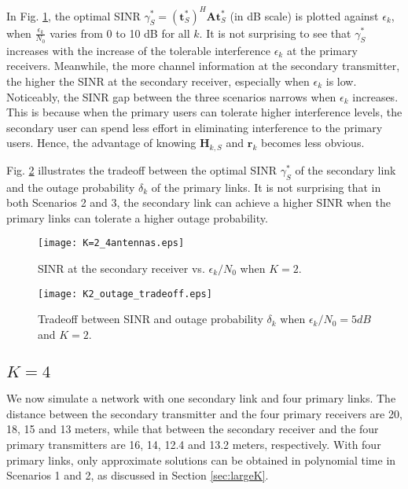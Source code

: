 \documentclass[twocolumn,10pt]{IEEEtran}
\theoremstyle{plain} \newtheorem{theorem}{Theorem}
\theoremstyle{plain} \newtheorem{proposition}{Proposition}
\theoremstyle{plain} \newtheorem{corollary}{Corollary}
\theoremstyle{remark} \newtheorem{remark}{Remark}
\theoremstyle{remark} \newtheorem{lemma}{Lemma}
\theoremstyle{plain} \newtheorem{definition}{Definition}
\theoremstyle{plain} \newtheorem{assumption}{Assumption}
\theoremstyle{plain} \newtheorem{fact}{Fact}
\begin{document}
In Fig. \ref{fig:K2SINR}, the optimal SINR $\gamma_S^*=(\mathbf{t}_S^*)^H\mathbf{A}\mathbf{t}_S^*$ (in dB scale) is plotted against $\epsilon_k$, when $\frac{\epsilon_k}{N_0}$ varies from 0 to 10 dB for all $k$. It is not surprising to see that $\gamma_S^*$ increases with the increase of the tolerable interference $\epsilon_k$ at the primary receivers. Meanwhile, the more channel information at the secondary transmitter, the higher the SINR at the secondary receiver, especially when $\epsilon_k$ is low. Noticeably, the SINR gap between the three scenarios narrows when $\epsilon_k$ increases. This is because when the primary users can tolerate higher interference levels, the secondary user can spend less effort in eliminating interference to the primary users. Hence, the advantage of knowing $\mathbf{H}_{k,S}$ and $\mathbf{r}_{k}$ becomes less obvious.

Fig. \ref{fig:K2outage} illustrates the tradeoff between the optimal SINR $\gamma_S^*$ of the secondary link and the outage probability $\delta_k$ of the primary links. It is not surprising that in both Scenarios 2 and 3, the secondary link can achieve a higher SINR when the primary links can tolerate a higher outage probability.

\begin{figure}[!ht]
\centering
\texttt{[image: K=2\_4antennas.eps]}
\caption{SINR at the secondary receiver vs. $\epsilon_k/N_0$ when $K=2$.}\label{fig:K2SINR}
\end{figure}

\begin{figure}[!ht]
\centering
\texttt{[image: K2\_outage\_tradeoff.eps]}
\caption{Tradeoff between SINR and outage probability $\delta_k$ when $\epsilon_k/N_0=5dB$ and $K=2$.}\label{fig:K2outage}
\end{figure}

\subsection{$K=4$}
We now simulate a network with one secondary link and four primary links. The distance between the secondary transmitter and the four primary receivers are 20, 18, 15 and 13 meters, while that between the secondary receiver and the four primary transmitters are 16, 14, 12.4 and 13.2 meters, respectively. With four primary links, only approximate solutions can be obtained in polynomial time in Scenarios 1 and 2, as discussed in Section \ref{sec:largeK}.
\end{document}
